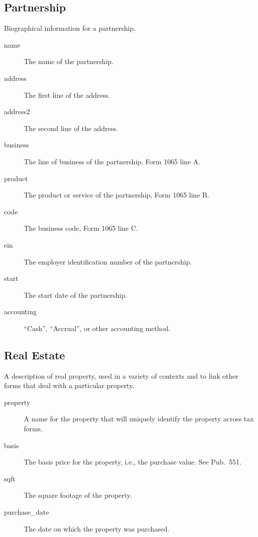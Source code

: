 \documentclass[12pt]{article}
\begin{document}
\subsection{Partnership}

Biographical information for a partnership.

\begin{description}
\item[name] The name of the partnership.
\item[address] The first line of the address.
\item[address2] The second line of the address.
\item[business] The line of business of the partnership, Form 1065 line A.
\item[product] The product or service of the partnership, Form 1065 line B.
\item[code] The business code, Form 1065 line C.
\item[ein] The employer identification number of the partnership.
\item[start] The start date of the partnership.
\item[accounting] ``Cash'', ``Accrual'', or other accounting method.
\end{description}

\subsection{Real Estate}

A description of real property, used in a variety of contexts and to link other
forms that deal with a particular property.

\begin{description}
\item[property] A name for the property that will uniquely identify the property
across tax forms.
\item[basis] The basis price for the property, i.e., the purchase value. See
Pub.\ 551.
\item[sqft] The square footage of the property.
\item[purchase\_date] The date on which the property was purchased.
\end{description}
\end{document}
